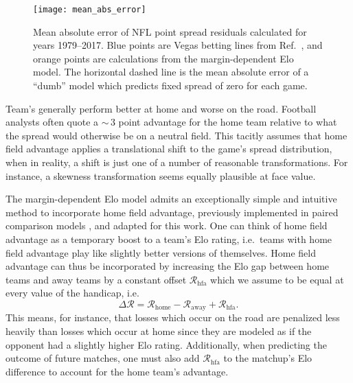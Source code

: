 \documentclass[aps,prc,reprint,amsmath,superscriptaddress,nofootinbib]{revtex4-1}
\begin{document}
\begin{figure}
    \texttt{[image: mean\_abs\_error]}
    \caption{\label{fig:mean_abs_error} Mean absolute error of NFL point spread residuals calculated for years 1979--2017. Blue points are Vegas betting lines from Ref.~\cite{vegaslines}, and orange points are calculations from the margin-dependent Elo model. The horizontal dashed line is the mean absolute error of a ``dumb'' model which predicts fixed spread of zero for each game.}
\end{figure}

Team's generally perform better at home and worse on the road.
Football analysts often quote a ${\sim}\,3$ point advantage for the home team relative to what the spread would otherwise be on a neutral field. 
This tacitly assumes that home field advantage applies a translational shift to the game's spread distribution, when in reality, a shift is just one of a number of reasonable transformations.
For instance, a skewness transformation seems equally plausible at face value.

The margin-dependent Elo model admits an exceptionally simple and intuitive method to incorporate home field advantage, previously implemented in paired comparison models \cite{glickman_thesis}, and adapted for this work.
One can think of home field advantage as a temporary boost to a team's Elo rating, i.e.\ teams with home field advantage play like slightly better versions of themselves.  
Home field advantage can thus be incorporated by increasing the Elo gap between home teams and away teams by a constant offset $\mathcal{R}_\text{hfa}$ which we assume to be equal at every value of the handicap, i.e.\
\begin{equation}
  \label{hfa}
  \Delta \mathcal{R} = \mathcal{R}_\text{home} - \mathcal{R}_\text{away} + \mathcal{R}_\text{hfa}.
\end{equation}
This means, for instance, that losses which occur on the road are penalized less heavily than losses which occur at home since they are modeled as if the opponent had a slightly higher Elo rating.
Additionally, when predicting the outcome of future matches, one must also add $\mathcal{R}_\text{hfa}$ to the matchup's Elo difference to account for the home team's advantage.
\end{document}
